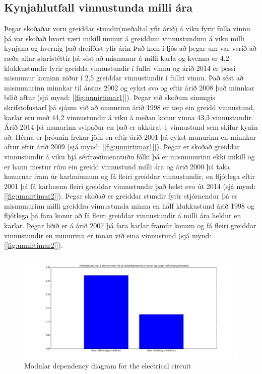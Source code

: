 \documentclass[12pt, svn, draft]{rureport}
\begin{document}
\subsection{Kynjahlutfall vinnustunda milli ára}
Þegar skoðaðar voru greiddar stundir(meðaltal yfir árið) á viku fyrir fulla vinnu þá var skoðað hvort væri mikill munur á greiddum vinnustundum á viku milli kynjana og hvernig það dreifðist yfir árin
Það kom í ljós að þegar um var verið að ræða allar starfstéttir þá sést að mismunur á milli karla og kvenna er 4,2 klukkustundir fyrir greidda vinnustundir í fullri vinnu og árið 2014 er þessi mismunur kominn niður í 2,5 greiddar vinnustundir í fullri vinnu.
Það sést að mismunurinn minnkar til ársins 2002 og eykst svo og eftir árið 2008 það minnkar bilið aftur (sjá mynd: [\ref{fig:unnirtimar1}]). 
\newline
\newline
Þegar við skoðum einungis skrifstofustarf þá sjáum við að munurinn árið 1998 er tæp ein greidd vinnustund, karlar eru með 44,2 vinnustundir á viku á meðan konur vinna 43,3 vinnustundir. Árið 2014 þá munurinn svipaður en það er akkúrat 1 vinnustund sem skilur kynin að.
Hérna er þróunin frekar jöfn en eftir árið 2001 þá eykst munurinn en minnkar aftur eftir árið 2009 (sjá mynd: [\ref{fig:unnirtimar1}]).
\newline
\newline
Þegar er skoðað greiddar vinnustundir á viku hjá sérfræðimenntuðu fólki þá er mismunurinn ekki mikill og er hann mestur rúm ein greidd vinnustund milli ára og árið 2000 þá taka konurnar fram úr karlmönnum og fá fleiri greiddar vinnustundir, en fljótlega eftir 2001 þá fá karlmenn fleiri greiddar vinnustundir það helst svo út 2014 (sjá mynd: [\ref{fig:unnirtimar2}]).
\newline
\newline
Þegar skoðað er greiddar stundir fyrir stjórnendur þá er mismunurinn milli greiddra vinnustunda minna en hálf klukkustund árið 1998 og fljótlega þá fara konur að fá fleiri greiddar vinnustundir á milli ára heldur en karlar. Þegar liðið er á árið 2007 þá fara karlar framúr konum og fá fleiri greiddar vinnustundir en munurinn er innan við eina vinnustund (sjá mynd: [\ref{fig:unnirtimar2}]). 

\begin{figure}
	\centering 
	\includegraphics[width=\textwidth]{../graphics/Haskolamentun_karlar_innan_utan_hs.png}
	\caption{Modular dependency diagram for the electrical circuit \label{fig:menntukarla}}
\end{figure}
\end{document}
